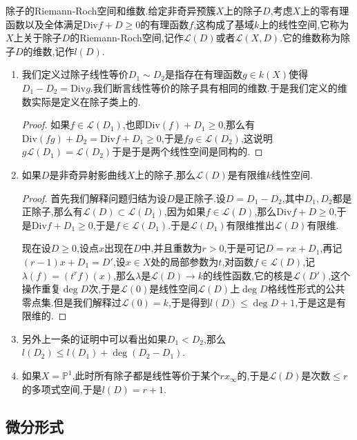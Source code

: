 除子的Riemann-Roch空间和维数.给定非奇异预簇$X$上的除子$D$,考虑$X$上的零有理函数以及全体满足$\mathrm{Div}f+D\ge0$的有理函数$f$,这构成了基域$k$上的线性空间,它称为$X$上关于除子$D$的Riemann-Roch空间,记作$\mathscr{L}(D)$或者$\mathscr{L}(X,D)$.它的维数称为除子$D$的维数,记作$l(D)$.
\begin{enumerate}
	\item 我们定义过除子线性等价$D_1\sim D_2$是指存在有理函数$g\in k(X)$使得$D_1-D_2=\mathrm{Div}g$.我们断言线性等价的除子具有相同的维数.于是我们定义的维数实际是定义在除子类上的.
	\begin{proof}
		
		如果$f\in\mathscr{L}(D_1)$,也即$\mathrm{Div}(f)+D_1\ge0$,那么有$\mathrm{Div}(fg)+D_2=\mathrm{Div}f+D_1\ge0$,于是$fg\in\mathscr{L}(D_2)$,这说明$g\mathscr{L}(D_1)=\mathscr{L}(D_2)$于是于是两个线性空间是同构的.
	\end{proof}
    \item 如果$D$是非奇异射影曲线$X$上的除子,那么$\mathscr{L}(D)$是有限维$k$线性空间.
    \begin{proof}
    	
    	首先我们解释问题归结为设$D$是正除子.设$D=D_1-D_2$,其中$D_1,D_2$都是正除子,那么有$\mathscr{L}(D)\subset\mathscr{L}(D_1)$,因为如果$f\in\mathscr{L}(D)$,那么$\mathrm{Div}f+D\ge0$,于是$\mathrm{Div}f+D_1\ge0$,于是$f\in\mathscr{L}(D_1)$.于是$\mathscr{L}(D_1)$有限维推出$\mathscr{L}(D)$有限维.
    	
    	现在设$D\ge0$,设点$x$出现在$D$中,并且重数为$r>0$,于是可记$D=rx+D_1$,再记$(r-1)x+D_1=D'$,设$x\in X$处的局部参数为$t$,对函数$f\in\mathscr{L}(D)$,记$\lambda(f)=(t^rf)(x)$,那么$\lambda$是$\mathscr{L}(D)\to k$的线性函数,它的核是$\mathscr{L}(D')$,这个操作重复$\deg D$次,于是$\mathscr{L}(0)$是线性空间$\mathscr{L}(D)$上$\deg D$格线性形式的公共零点集.但是我们解释过$\mathscr{L}(0)=k$,于是得到$l(D)\le\deg D+1$,于是这是有限维的.
    \end{proof}
    \item 另外上一条的证明中可以看出如果$D_1<D_2$,那么$l(D_2)\le l(D_1)+\deg(D_2-D_1)$.
    \item 如果$X=\mathbb{P}^1$,此时所有除子都是线性等价于某个$rx_{\infty}$的,于是$\mathscr{L}(D)$是次数$\le r$的多项式空间,于是$l(D)=r+1$.
\end{enumerate}


\newpage
\subsection{微分形式}

